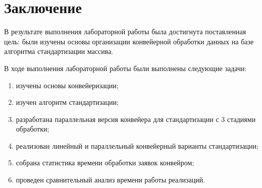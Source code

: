 \chapter*{Заключение}

В результате выполнения лабораторной работы была достигнута поставленная цель: были изучены основы организации конвейерной обработки данных на базе алгоритма стандартизации массива.

В ходе выполнения лабораторной работы были выполнены следующие задачи: 
\begin{enumerate}[label={\arabic*)}]
	\item изучены основы конвейеризации;
	\item изучен алгоритм стандартизации;
	\item разработана параллельная версия конвейера для стандартизации с 3 стадиями обработки;
	\item реализован линейный и параллельный конвейерный варианты стандартизации;
	\item собрана статистика времени обработки заявок конвейром;
	\item проведен сравнительный анализ времени работы реализаций.
\end{enumerate}




